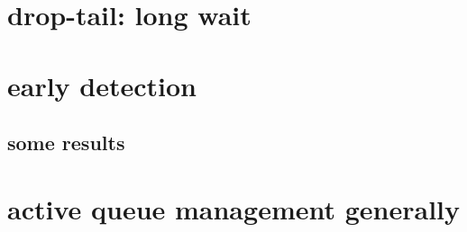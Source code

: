 \section{drop-tail: long wait}


\section{early detection}


\subsection{some results}


\section{active queue management generally}

